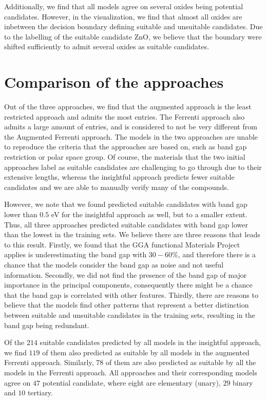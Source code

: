 Additionally, we find that all models agree on several oxides being potential candidates. However, in the visualization, we find that almost all oxides are inbetween the decision boundary defining suitable and unsuitable candidates. Due to the labelling of the suitable candidate ZnO, we believe that the boundary were shifted sufficiently to admit several oxides as suitable candidates.


\section{Comparison of the approaches}

Out of the three approaches, we find that the augmented approach is the least restricted approach and admits the most entries. The Ferrenti approach also admits a large amount of entries, and is considered to not be very different from the Augmented Ferrenti approach. The models in the two approaches are unable to reproduce the criteria that the approaches are based on, such as band gap restriction or polar space group. Of course, the materials that the two initial approaches label as suitable candidates are challenging to go through due to their extensive lengths, whereas the insightful approach predicts fewer suitable candidates and we are able to manually verify many of the compounds.

However, we note that we found predicted suitable candidates with band gap lower than $0.5$ eV for the insightful approach as well, but to a smaller extent. Thus, all three approaches predicted suitable candidates with band gap lower than the lowest in the training sets. We believe there are three reasons that leads to this result. Firstly, we found that the GGA functional Materials Project applies is underestimating the band gap with $30-60\%$, and therefore there is a chance that the models consider the band gap as noise and not useful information. Secondly, we did not find the presence of the band gap of major importance in the principal components, consequently there might be a chance that the band gap is correlated with other features. Thirdly, there are reasons to believe that the models find other patterns that represent a better distinction between suitable and unsuitable candidates in the training sets, resulting in the band gap being redundant.

Of the $214$ suitable candidates predicted by all models in the insightful approach, we find $119$ of them also predicted as suitable by all models in the augmented Ferrenti approach. Similarly, $78$ of them are also predicted as suitable by all the models in the Ferrenti approach. All approaches and their corresponding models agree on $47$ potential candidate, where eight are elementary (unary), $29$ binary and $10$ tertiary.

